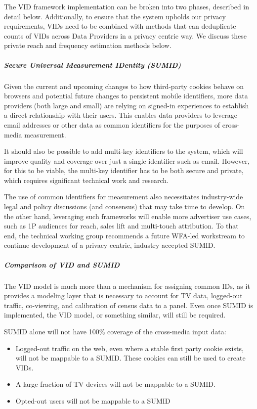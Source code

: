 \documentclass[]{article}
\providecommand{\tightlist}{%
  \setlength{\itemsep}{0pt}\setlength{\parskip}{0pt}}
\let\oldsubparagraph\subparagraph
\renewcommand{\subparagraph}[1]{\oldsubparagraph{#1}\mbox{}}
\begin{document}
The VID framework implementation can be broken into two phases, described in detail below. Additionally, to ensure that the system upholds our privacy requirements, VIDs need to be combined with methods
that can deduplicate counts of VIDs across Data Providers in a privacy centric way. We discuss these private reach and frequency estimation methods below.

\subparagraph{Secure Universal Measurement IDentity (SUMID)}

Given the current and upcoming changes to how third-party cookies behave on browsers and potential future changes to persistent mobile identifiers, more data providers (both large and small) are relying on
signed-in experiences to establish a direct relationship with their users. This enables data providers to leverage email addresses or other data as common identifiers for the purposes of cross-media measurement.

It should also be possible to add multi-key identifiers to the system, which will improve quality and coverage over just a single identifier such as email. However, for this to be viable, the multi-key identifier
has to be both secure and private, which requires significant technical work and research.

The use of common identifiers for measurement also necessitates industry-wide legal and policy discussions (and consensus) that may take time to develop. On the other hand, leveraging such frameworks will enable more advertiser use cases, such as 1P audiences for reach, sales lift and multi-touch attribution. To that end, the technical working group recommends a future WFA-led workstream to continue development of a privacy centric, industry accepted SUMID.

\subparagraph{Comparison of VID and SUMID}

The VID model is much more than a mechanism for assigning common IDs, as it provides a modeling layer that is necessary to account for TV data, logged-out traffic, co-viewing, and calibration of census data to a
panel. Even once SUMID is implemented, the VID model, or something similar, will still be required.

SUMID alone will not have 100\% coverage of the cross-media input data:

\begin{itemize}
\tightlist
\item
  Logged-out traffic on the web, even where a stable first party cookie
  exists, will not be mappable to a SUMID. These cookies can still be
  used to create VIDs.
\item
  A large fraction of TV devices will not be mappable to a SUMID.
\item
  Opted-out users will not be mappable to a SUMID
\end{itemize}
\end{document}
